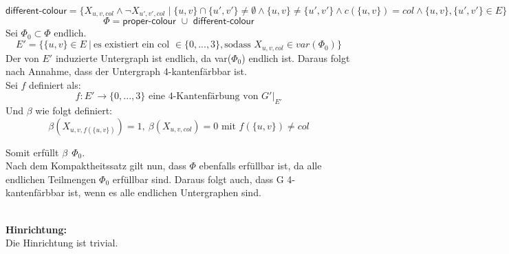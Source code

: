 \documentclass[a4paper,10pt]{article}
\begin{document}
	\[\textsf{different-colour} = 
	 \{ X_{u,v,col} \wedge \neg X_{u',v',col}\mid
	\{ u,v \} \cap \{ u',v' \} \neq \emptyset \wedge 
	\{ u,v \} \neq \{ u',v' \} \wedge 
	c(\{ u,v \}) = col \wedge 
	\{u,v\},\{u',v'\} \in E \} \] 
	\[\Phi = \textsf{proper-colour } \cup \textsf{ different-colour} \]
	Sei $\Phi_0 \subset \Phi$ endlich. 
	\[E' = \{ \{u,v\} \in E~|~\text{es existiert ein col } \in \{0,...,3\}, \text{sodass } X_{u,v,col} \in var(\Phi_0) \}\] 
	Der von $E'$ induzierte Untergraph ist endlich, da var($\Phi_0$) endlich ist. Daraus folgt nach Annahme, dass der Untergraph 4-kantenfärbbar ist.\\
	Sei $f$ definiert als:
	\[f: E' \rightarrow \{0,...,3\} \text{ eine 4-Kantenfärbung von } G' |_{E'}\]
	Und $\beta$ wie folgt definiert: \\
	\[\beta(X_{u,v,f(\{ u,v \})}) = 1,~\beta(X_{u,v,col}) = 0 \text{ mit } f(\{ u,v \}) \neq col \] 

	Somit erfüllt $\beta~~\Phi_0$.\\
	Nach dem Kompaktheitssatz gilt nun, dass $\Phi$ ebenfalls erfüllbar ist, da alle endlichen Teilmengen $\Phi_0$ erfüllbar sind. Daraus folgt auch, dass G 4-kantenfärbbar ist, wenn es alle endlichen Untergraphen sind.
	
	\ \\ \textbf{Hinrichtung:} \\
	Die Hinrichtung ist trivial.
	
\end{document}
